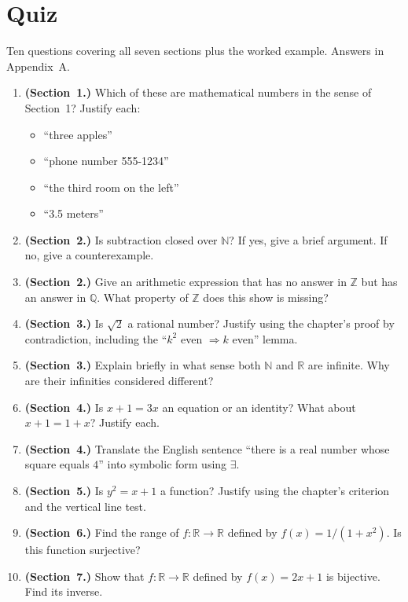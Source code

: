 \section{Quiz}

Ten questions covering all seven sections plus the worked example. Answers in Appendix~A.

\begin{enumerate}
  \item \textbf{(Section~1.)} Which of these are mathematical numbers in the sense of Section~1? Justify each:
    \begin{itemize}[nosep]
      \item ``three apples''
      \item ``phone number 555-1234''
      \item ``the third room on the left''
      \item ``3.5 meters''
    \end{itemize}

  \item \textbf{(Section~2.)} Is subtraction closed over $\mathbb{N}$? If yes, give a brief argument. If no, give a counterexample.

  \item \textbf{(Section~2.)} Give an arithmetic expression that has no answer in $\mathbb{Z}$ but has an answer in $\mathbb{Q}$. What property of $\mathbb{Z}$ does this show is missing?

  \item \textbf{(Section~3.)} Is $\sqrt{2}$ a rational number? Justify using the chapter's proof by contradiction, including the ``$k^2$ even $\Rightarrow k$ even'' lemma.

  \item \textbf{(Section~3.)} Explain briefly in what sense both $\mathbb{N}$ and $\mathbb{R}$ are infinite. Why are their infinities considered different?

  \item \textbf{(Section~4.)} Is $x + 1 = 3x$ an equation or an identity? What about $x + 1 = 1 + x$? Justify each.

  \item \textbf{(Section~4.)} Translate the English sentence ``there is a real number whose square equals $4$'' into symbolic form using $\exists$.

  \item \textbf{(Section~5.)} Is $y^2 = x + 1$ a function? Justify using the chapter's criterion and the vertical line test.

  \item \textbf{(Section~6.)} Find the range of $f : \mathbb{R} \to \mathbb{R}$ defined by $f(x) = 1 / (1 + x^2)$. Is this function surjective?

  \item \textbf{(Section~7.)} Show that $f : \mathbb{R} \to \mathbb{R}$ defined by $f(x) = 2x + 1$ is bijective. Find its inverse.
\end{enumerate}


